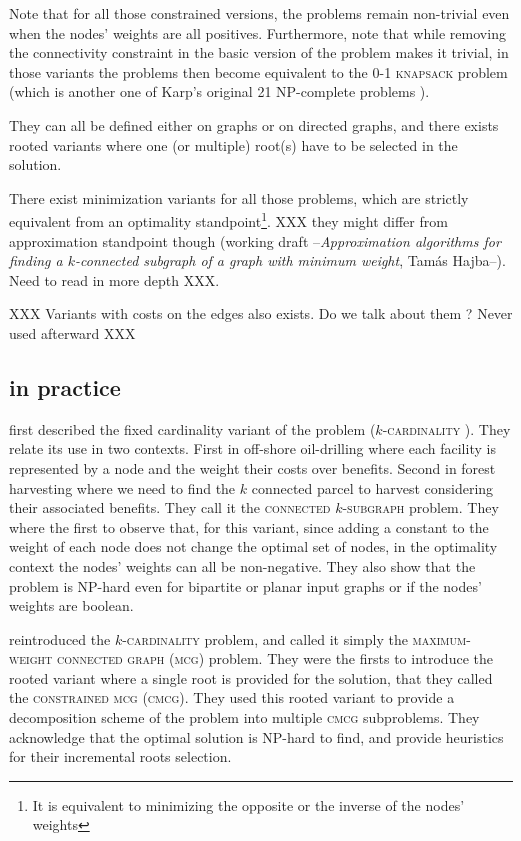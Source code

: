 	Note that for all those constrained versions, the problems remain non-trivial even when the nodes' weights are all positives.
	Furthermore, note that while removing the connectivity constraint in the basic version of the problem makes it trivial, in those variants the problems then become equivalent to the \textsc{0-1 knapsack} problem (which is another one of Karp's original 21 NP-complete problems \parencite{karp1972reducibility}).

	They can all be defined either on graphs or on directed graphs, and there exists rooted variants where one (or multiple) root(s) have to be selected in the solution.

	There exist minimization variants for all those problems, which are strictly equivalent from an optimality standpoint\footnote{It is equivalent to minimizing the opposite or the inverse of the nodes' weights}.
	XXX they might differ from approximation standpoint though (working draft --\emph{Approximation algorithms for finding a $k$-connected subgraph of a graph with minimum weight}, Tam\'{a}s Hajba--). Need to read in more depth XXX.

	XXX Variants with costs on the edges also exists. Do we talk about them ? Never used afterward XXX

	\subsection{\mwcs{} in practice}

		\Textcite{hochbaum1994node} first described the fixed cardinality variant of the problem (\textsc{$k$-cardinality \mwcs{}}).
		They relate its use in two contexts.
		First in off-shore oil-drilling where each facility is represented by a node and the weight their costs over benefits.
		Second in forest harvesting where we need to find the $k$ connected parcel to harvest considering their associated benefits.
		They call it the \textsc{connected $k$-subgraph} problem.
		They where the first to observe that, for this variant, since adding a constant to the weight of each node does not change the optimal set of nodes, in the optimality context the nodes' weights can all be non-negative.
		They also show that the problem is NP-hard even for bipartite or planar input graphs or if the nodes' weights are boolean.

		\Textcite{lee1998decomposition} reintroduced the \textsc{$k$-cardinality \mwcs{}} problem, and called it simply the \textsc{maximum-weight connected graph} (\textsc{mcg}) problem.
		They were the firsts to introduce the rooted variant where a single root is provided for the solution, that they called the \textsc{constrained mcg} (\textsc{cmcg}).
		They used this rooted variant to provide a decomposition scheme of the \mwcs{} problem into multiple \textsc{cmcg} subproblems.
		They acknowledge that the optimal solution is NP-hard to find, and provide heuristics for their incremental roots selection.

